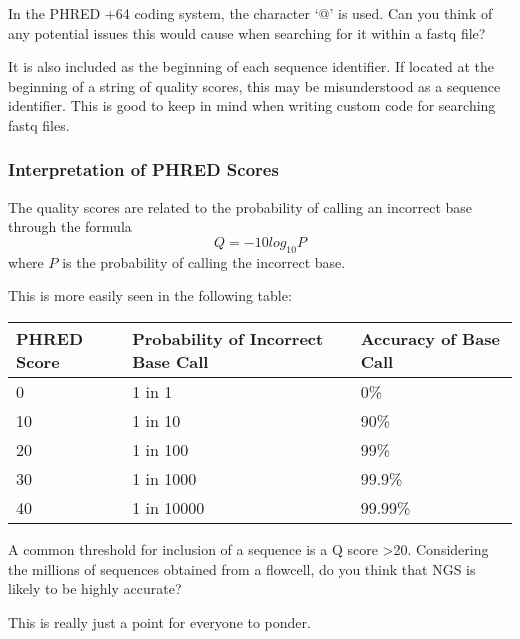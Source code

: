 \begin{questions}
In the PHRED +64 coding system, the character `@' is used.
Can you think of any potential issues this would cause when searching for it within a fastq file? \\
\begin{answer}
It is also included as the beginning of each sequence identifier.
If located at the beginning of a string of quality scores, this may be misunderstood as a sequence identifier.
This is good to keep in mind when writing custom code for searching fastq files.
\end{answer}
\end{questions}

\subsubsection{Interpretation of PHRED Scores}
\begin{note}
The quality scores are related to the probability of calling an incorrect base through the formula
\begin{equation}
  \label{eq:PHRED}
  Q = -10 log_{10} P
\end{equation}
where $P$ is the probability of calling the incorrect base. \\
\end{note}

This is more easily seen in the following table: \\
\begin{center}
\begin{tabular}[h]{|p{3cm} p{5cm} p{3cm}|}
\hline
\textbf{PHRED Score} & \textbf{Probability of Incorrect Base Call} &
\textbf{Accuracy of Base Call} \\
\hline
0 & 1 in 1 & 0\% \\
10 & 1 in 10 & 90\% \\
20 & 1 in 100 & 99\% \\
30 & 1 in 1000 & 99.9\% \\
40 & 1 in 10000 & 99.99\% \\
\hline
\end{tabular}
\end{center}

\begin{questions}
A common threshold for inclusion of a sequence is a Q score >20.
Considering the millions of sequences obtained from a flowcell, do you think that NGS is likely to be highly accurate?\\
\begin{answer}
This is really just a point for everyone to ponder.
\end{answer}
\end{questions}

